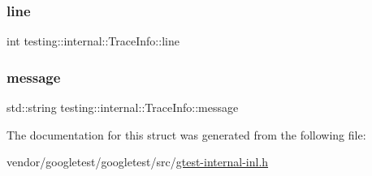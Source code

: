 \subsubsection{\texorpdfstring{line}{line}}
{\footnotesize\ttfamily int testing\+::internal\+::\+Trace\+Info\+::line}

\mbox{\label{structtesting_1_1internal_1_1_trace_info_a39e74f39ce6d5fdbac799abdb1c27f90}} 
\subsubsection{\texorpdfstring{message}{message}}
{\footnotesize\ttfamily std\+::string testing\+::internal\+::\+Trace\+Info\+::message}



The documentation for this struct was generated from the following file\+:\begin{DoxyCompactItemize}
\item 
vendor/googletest/googletest/src/\hyperlink{gtest-internal-inl_8h}{gtest-\/internal-\/inl.\+h}\end{DoxyCompactItemize}
